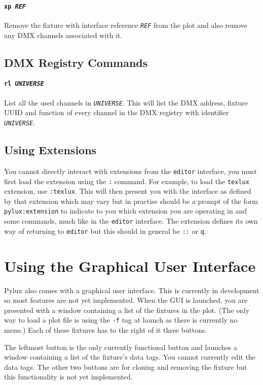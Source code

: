\documentclass[a4paper]{article}
\begin{document}
\paragraph{\texttt{xp \textit{REF}}}
Remove the fixture with interface reference \texttt{\textit{REF}} from the 
plot and also remove any DMX channels associated with it.

\subsection{DMX Registry Commands}

\paragraph{\texttt{rl \textit{UNIVERSE}}}
List all the used channels in \texttt{\textit{UNIVERSE}}. This will list the 
DMX address, fixture UUID and function of every channel in the DMX registry 
with identifier \texttt{\textit{UNIVERSE}}.

\subsection{Using Extensions}
You cannot directly interact with extensions from the \texttt{editor} 
interface, you must first load the extension using the \texttt{:} command.
For example, to load the \texttt{texlux} extension, use \texttt{:texlux}. 
This will then present you with the interface as defined by that extension 
which may vary but in practise should be a prompt of the form 
\texttt{pylux:extension} to indicate to you which extension you are 
operating in and some commands, much like in the \texttt{editor} interface.
The extension defines its own way of returning to \texttt{editor} but this 
should in general be \texttt{::} or \texttt{q}.

\section{Using the Graphical User Interface}
Pylux also comes with a graphical user interface. This is currently in 
development so most features are not yet implemented. When the GUI is 
launched, you are presented with a window containing a list of the fixtures 
in the plot. (The only way to load a plot file is using the \texttt{-f} tag 
at launch as there is currently no menu.) Each of these fixtures has to the 
right of it three buttons.

The leftmost button is the only currently functional button and launches a 
window containing a list of the fixture's data tags. You cannot currently 
edit the data tags. The other two buttons are for cloning and removing the 
fixture but this functionality is not yet implemented.
\end{document}
